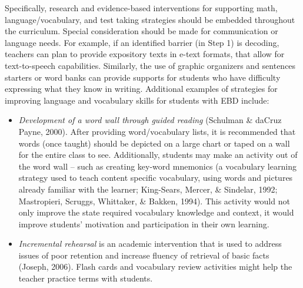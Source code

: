 \documentclass[11.5pt]{sig-alternate} %
\begin{document}
\begin{large}
Specifically, research and evidence-based interventions for supporting math, language/vocabu\-lary, and test taking strategies should be embedded throughout the curriculum. Special consideration should be made for communication or language needs. For example, if an identified barrier (in Step 1) is decoding, teachers can plan to provide expository texts in e-text formats, that allow for text-to-speech capabilities. Similarly, the use of graphic organizers and sentences starters or word banks can provide supports for students who have difficulty expressing what they know in writing. Additional examples of strategies for improving language and vocabulary skills for students with EBD include: 
\begin{itemize}
    \item \textit{Development of a word wall through guided reading} (Schulman \& daCruz Payne, 2000). After providing word/vocabulary lists, it is recommended that words (once taught) should be depicted on a large chart or taped on a wall for the entire class to see. Additionally, students may make an activity out of the word wall – such as creating key-word mnemonics (a vocabulary learning strategy used to teach content specific vocabulary, using words and pictures already familiar with the learner; King-Sears, Mercer, \& Sindelar, 1992; Mastropieri, Scruggs, Whittaker, \& Bakken, 1994). This activity would not only improve the state required vocabulary knowledge and context, it would improve students’ motivation and participation in their own learning.
    \item \textit{Incremental rehearsal} is an academic intervention that is used to address issues of poor retention and increase fluency of retrieval of basic facts (Joseph, 2006). Flash cards and vocabulary review activities might help the teacher practice terms with students.
\end{itemize}


\end{large}
\end{document}

